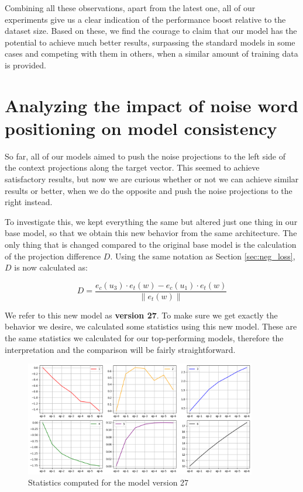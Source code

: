 Combining all these observations, apart from the latest one, all of our experiments give us a clear indication of the performance boost relative to the dataset size. Based on these, we find the courage to claim that our model has the potential to achieve much better results, surpassing the standard models in some cases and competing with them in others, when a similar amount of training data is provided.



\section{Analyzing the impact of noise word positioning on model consistency}

So far, all of our models aimed to push the noise projections to the left side of the context projections along the target vector. This seemed to achieve satisfactory results, but now we are curious whether or not we can achieve similar results or better, when we do the opposite and push the noise projections to the right instead.

To investigate this, we kept everything the same but altered just one thing in our base model, so that we obtain this new behavior from the same architecture. The only thing that is changed compared to the original base model is the calculation of the projection difference $D$. Using the same notation as Section \ref{sec:neg_loss}, $D$ is now calculated as:

\[ 
D = \frac{e_c(u_3) \cdot e_t(w) - e_c(u_1) \cdot e_t(w)}{\left \| e_t(w) \right \|}
\]

We refer to this new model as \textbf{version 27}. To make sure we get exactly the behavior we desire, we calculated some statistics using this new model. These are the same statistics we calculated for our top-performing models, therefore the interpretation and the comparison will be fairly straightforward.

\begin{figure}[h]
    \centering
    \includegraphics[width=0.9\textwidth]{img/pushleft-stats.png}
    \caption{Statistics computed for the model version 27}
    \label{fig:pushleft-stats}
\end{figure}

